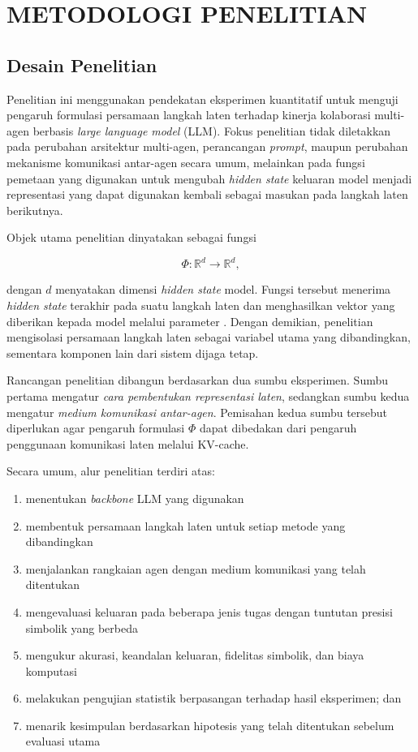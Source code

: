 \chapter{METODOLOGI PENELITIAN}


\section{Desain Penelitian}

Penelitian ini menggunakan pendekatan eksperimen kuantitatif untuk menguji pengaruh formulasi persamaan langkah laten terhadap kinerja kolaborasi multi-agen berbasis \textit{large language model} (LLM). Fokus penelitian tidak diletakkan pada perubahan arsitektur multi-agen, perancangan \textit{prompt}, maupun perubahan mekanisme komunikasi antar-agen secara umum, melainkan pada fungsi pemetaan yang digunakan untuk mengubah \textit{hidden state} keluaran model menjadi representasi yang dapat digunakan kembali sebagai masukan pada langkah laten berikutnya.

Objek utama penelitian dinyatakan sebagai fungsi

\[
\Phi:\mathbb{R}^{d}\rightarrow\mathbb{R}^{d},
\]

dengan \(d\) menyatakan dimensi \textit{hidden state} model. Fungsi tersebut menerima \textit{hidden state} terakhir pada suatu langkah laten dan menghasilkan vektor yang diberikan kepada model melalui parameter . Dengan demikian, penelitian mengisolasi persamaan langkah laten sebagai variabel utama yang dibandingkan, sementara komponen lain dari sistem dijaga tetap.

Rancangan penelitian dibangun berdasarkan dua sumbu eksperimen. Sumbu pertama mengatur \textit{cara pembentukan representasi laten}, sedangkan sumbu kedua mengatur \textit{medium komunikasi antar-agen}. Pemisahan kedua sumbu tersebut diperlukan agar pengaruh formulasi \(\Phi\) dapat dibedakan dari pengaruh penggunaan komunikasi laten melalui KV-cache.

Secara umum, alur penelitian terdiri atas:

\begin{enumerate}
    \item menentukan \textit{backbone} LLM yang digunakan
    \item membentuk persamaan langkah laten untuk setiap metode yang dibandingkan
    \item menjalankan rangkaian agen dengan medium komunikasi yang telah ditentukan
    \item mengevaluasi keluaran pada beberapa jenis tugas dengan tuntutan presisi simbolik yang berbeda
    \item mengukur akurasi, keandalan keluaran, fidelitas simbolik, dan biaya komputasi
    \item melakukan pengujian statistik berpasangan terhadap hasil eksperimen; dan
    \item menarik kesimpulan berdasarkan hipotesis yang telah ditentukan sebelum evaluasi utama
\end{enumerate}


